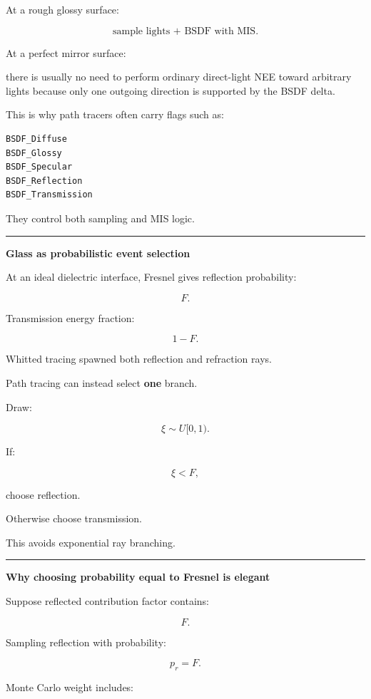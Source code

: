 At a rough glossy surface:

\[
\text{sample lights + BSDF with MIS}.
\]

At a perfect mirror surface:

there is usually no need to perform ordinary direct-light NEE toward arbitrary lights because only one outgoing direction is supported by the BSDF delta.

This is why path tracers often carry flags such as:

\begin{verbatim}
BSDF_Diffuse
BSDF_Glossy
BSDF_Specular
BSDF_Reflection
BSDF_Transmission
\end{verbatim}

They control both sampling and MIS logic.

\begin{center}\rule{0.5\linewidth}{0.5pt}\end{center}

\textbf{Glass as probabilistic event selection}

At an ideal dielectric interface, Fresnel gives reflection probability:

\[
F.
\]

Transmission energy fraction:

\[
1-F.
\]

Whitted tracing spawned both reflection and refraction rays.

Path tracing can instead select \textbf{one} branch.

Draw:

\[
\xi\sim U[0,1).
\]

If:

\[
\xi<F,
\]

choose reflection.

Otherwise choose transmission.

This avoids exponential ray branching.

\begin{center}\rule{0.5\linewidth}{0.5pt}\end{center}

\textbf{Why choosing probability equal to Fresnel is elegant}

Suppose reflected contribution factor contains:

\[
F.
\]

Sampling reflection with probability:

\[
p_r=F.
\]

Monte Carlo weight includes:

